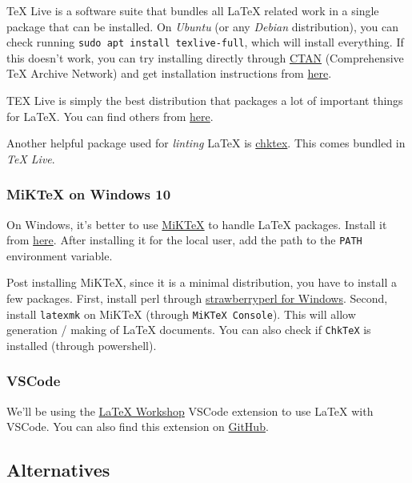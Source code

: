 \documentclass[]{article}
\begin{document}
TeX Live is a software suite that bundles all \LaTeX{} related work in a single package that can be installed. On \emph{Ubuntu} (or any \emph{Debian} distribution), you can check running \texttt{sudo apt install texlive-full}, which will install everything.
If this doesn't work, you can try installing directly through \href{https://ctan.org/pkg/texlive}{CTAN} (Comprehensive \TeX{} Archive Network) and get installation instructions from \href{https://www.tug.org/texlive/}{here}.

\noindent TEX Live is simply the best distribution that packages a lot of important things for \LaTeX{}. You can find others from \href{https://www.latex-project.org/get/}{here}.

\noindent Another helpful package used for \emph{linting} \LaTeX{} is \href{https://www.nongnu.org/chktex/}{chktex}. This comes bundled in \emph{TeX Live}.

\subsubsection*{MiKTeX on Windows 10}

On Windows, it's better to use \href{https://miktex.org/}{MiKTeX} to handle \LaTeX{} packages. Install it from \href{https://miktex.org/download}{here}. After installing it for the local user, add the path to the \texttt{PATH} environment variable.

\noindent Post installing MiKTeX, since it is a minimal distribution, you have to install a few packages. First, install perl through \href{https://strawberryperl.com/}{strawberryperl for Windows}. Second, install \texttt{latexmk} on MiKTeX (through \texttt{MiKTeX Console}). This will allow generation / making of \LaTeX{} documents. You can also check if \texttt{ChkTeX} is installed (through powershell).

\subsubsection*{VSCode}

We'll be using the \href{https://marketplace.visualstudio.com/items?itemName=James-Yu.latex-workshop}{LaTeX Workshop} VSCode extension to use \LaTeX{} with VSCode. You can also find this extension on \href{https://github.com/James-Yu/LaTeX-Workshop}{GitHub}.

\subsection{Alternatives}
\end{document}
